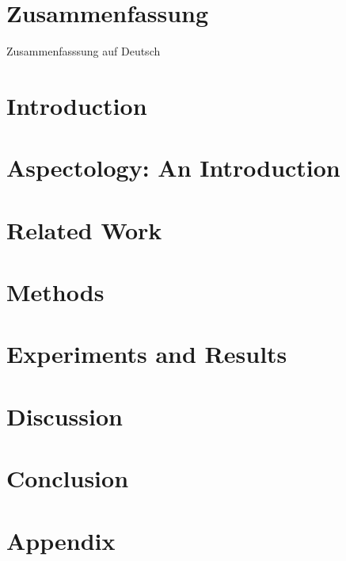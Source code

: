 \clearpage
\chapter*{Zusammenfassung}\label{c.zusammenfassung}
\foreignlanguage{ngerman}{
Zusammenfasssung auf Deutsch
}

\clearpage
\tableofcontents
\clearpage
\listoffigures
\clearpage
\listoftables

\clearpage
\pagestyle{scrplain}
\chapter{Introduction}\label{c.introduction}


\chapter{Aspectology: An Introduction}\label{c.aspectology}


\clearpage
\chapter{Related Work}\label{c.related}


\clearpage
\chapter{Methods}\label{c.methods}


% 

\clearpage
\chapter{Experiments and Results}\label{c.experiments}


\clearpage
\chapter{Discussion}\label{c.discussion}


\clearpage 
\chapter{Conclusion}\label{c.conclusion}



\clearpage
\appendix
\chapter{Appendix}


\clearpage



